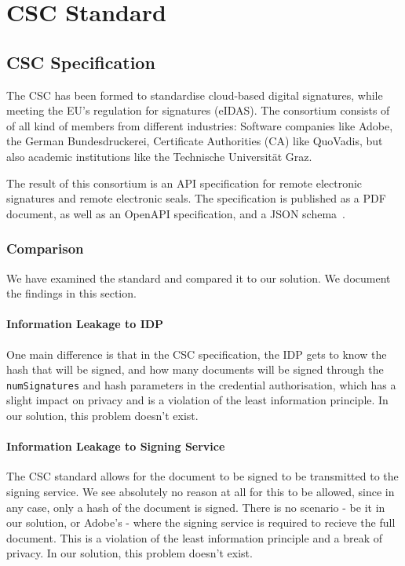 \chapter{CSC Standard}\label{ch:cscstandard}

\section{CSC Specification}\label{sec:csc-specification}

The \acrfull{CSC} has been formed to standardise cloud-based digital signatures, while meeting the \gls{EU}'s regulation for signatures (\gls{eIDAS}).
The consortium consists of of all kind of members from different industries: Software companies like Adobe,
the German Bundesdruckerei, Certificate Authorities (\gls{CA}) like QuoVadis,
but also academic institutions like the Technische Universit\"at Graz.

The result of this consortium is an \gls{API} specification for remote electronic signatures and remote electronic seals.
The specification is published as a \gls{PDF} document, as well as an \gls{OpenAPI} specification, and a \gls{JSON} schema~\cite{csc-spec}.


\subsection{Comparison}\label{subsec:comparison}
We have examined the standard and compared it to our solution.
We document the findings in this section.

\subsubsection{Information Leakage to IDP}

One main difference is that in the \gls{CSC} specification,
the \gls{IDP} gets to know the hash that will be signed,
and how many documents will be signed through the \texttt{numSignatures} and hash parameters in the credential authorisation,
which has a slight impact on privacy and is a violation of the least information principle.
In our solution, this problem doesn't exist.

\subsubsection{Information Leakage to Signing Service}
The \gls{CSC} standard allows for the document to be signed to be transmitted to the signing service.
We see absolutely no reason at all for this to be allowed,
since in any case,
only a hash of the document is signed.
There is no scenario - be it in our solution, or Adobe's - where the signing service is required to recieve the full document.
This is a violation of the least information principle and a break of privacy.
In our solution, this problem doesn't exist.

